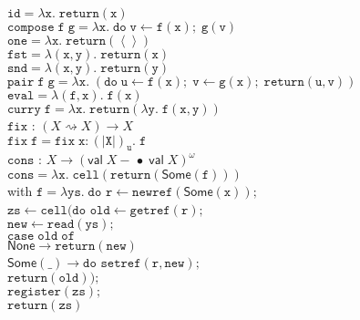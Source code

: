 \documentclass[nocopyrightspace,preprint]{sigplanconf}
\newcommand{\term}[1]{\ensuremath{\mathtt{{#1}}}}
\newcommand{\shrink}{\rightsquigarrow}
\newcommand{\unitval}{\left<\right>}
\newcommand{\interpu}[1]{(\!|{#1}|\!)_u}
\newcommand{\lollishrink}{-\!\!\!\,\bullet}
\newcommand{\valtype}[1]{\mathsf{val}\;{#1}}
\newcommand{\None}{\mathsf{None}}
\newcommand{\Some}[1]{\mathsf{Some}({#1})}
\newcommand{\fun}[2]{\lambda {#1}.\;{#2}}
\newcommand{\fix}[2]{\term{fix}\;{#1}.\;{#2}}
\begin{document}
\begin{figure}
{\small
\begin{tabbing}
\term{id = \fun{x}{return(x)}} 
\\
\term{compose\;f\;g = \fun{x}{do\;v\leftarrow f(x);\;g(v)}}
\\
\term{one = \fun{x}{return(\unitval)}}
\\
\term{fst = \fun{(x,y)}{return(x)}}
\\
\term{snd = \fun{(x,y)}{return(y)}}
\\
\term{pair\;f\;g = \fun{x}{(do\;u\leftarrow f(x);\;v \leftarrow g(x);\; return(u,v))}}
\\
\term{eval = \fun{(f,x)}{f(x)}}
\\
\term{curry\;f = \fun{x}{return(\fun{y}{f(x,y)})}}
\\[0.5em]
\term{fix} : $(X \shrink X) \to X$ \\
\term{fix\; f = \fix{x:\interpu{X}}{f}}
\\[0.5em]

\term{cons} : $X \to (\valtype{X} \lollishrink \;\valtype{X})^\omega$ \\
\term{cons = \lambda x.\; cell(return(\Some{f}))} \\
with \term{f = \lambda ys.\;do} \= \term{r \leftarrow newref(\Some{x});} \\
\>     \term{zs \leftarrow cell(}\= 
      \term{do} \=\term{old \leftarrow getref(r);} \\
\> \> \> \term{new \leftarrow read(ys);} \\
\> \> \> \term{case\;old\;of} \\
\> \> \> \;\;\= \term{\None \to return(new)} \\
\> \> \> \>     \term{\Some{\_} \to do} \=\term{setref(r, new);} \\
\> \> \> \>  \>                           \term{return(old));} \\                 
\> \term{register(zs);} \\
\> \term{return(zs)}\\[0.5em]



\end{tabbing}}
\end{figure}
\end{document}
